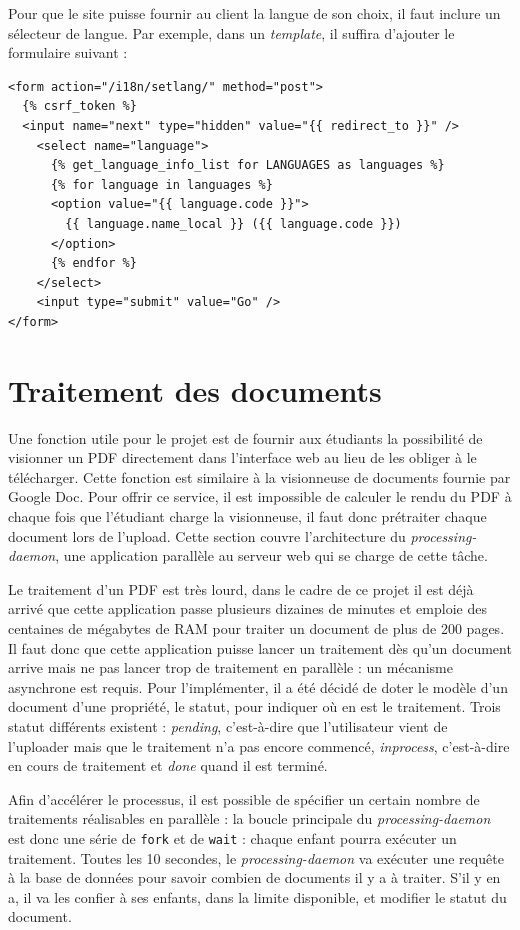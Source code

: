 \documentclass[a4paper,12pt]{article}
\begin{document}
Pour que le site puisse fournir au client la langue de son choix, il faut inclure
un sélecteur de langue. Par exemple, dans un \textit{template}, il suffira d'ajouter
le formulaire suivant : 

\begin{verbatim}
<form action="/i18n/setlang/" method="post">
  {% csrf_token %}
  <input name="next" type="hidden" value="{{ redirect_to }}" />
    <select name="language">
      {% get_language_info_list for LANGUAGES as languages %}
      {% for language in languages %}
      <option value="{{ language.code }}">
        {{ language.name_local }} ({{ language.code }})
      </option>
      {% endfor %}
    </select>
    <input type="submit" value="Go" />
</form>
\end{verbatim}


\section{Traitement des documents}

Une fonction utile pour le projet est de fournir aux étudiants la possibilité
de visionner un PDF directement dans l'interface web au lieu de les obliger
à le télécharger. Cette fonction est similaire à la visionneuse de documents fournie
par Google Doc. Pour offrir ce service, il est impossible de calculer le rendu du PDF
à chaque fois que l'étudiant charge la visionneuse, il faut donc prétraiter chaque
document lors de l'upload. Cette section couvre l'architecture du \textit{processing-daemon},
une application parallèle au serveur web qui se charge de cette tâche.

Le traitement d'un PDF est très lourd, dans le cadre de ce projet il est déjà
arrivé que cette application passe plusieurs dizaines de minutes et emploie des centaines
de mégabytes de RAM pour traiter un document de plus de 200 pages. Il faut
donc que cette application puisse lancer un traitement dès qu'un document arrive
mais ne pas lancer trop de traitement en parallèle : un mécanisme asynchrone est requis.
Pour l'implémenter, il a été décidé de doter le modèle d'un document d'une propriété,
le statut, pour indiquer où en est le traitement. Trois statut différents existent :  \textit{pending}, c'est-à-dire
que l'utilisateur vient de l'uploader mais que le traitement n'a pas encore commencé,
\textit{inprocess}, c'est-à-dire en cours de traitement et \textit{done} quand il est terminé.

Afin d'accélérer le processus, il est possible de spécifier un certain
nombre de traitements réalisables en parallèle : la boucle principale du \textit{processing-daemon}
est donc une série de \texttt{fork} et de \texttt{wait} : chaque enfant pourra exécuter un traitement.
Toutes les 10 secondes, le \textit{processing-daemon} va exécuter une requête à la base
de données pour savoir combien de documents il y a à traiter. S'il y en a, il va les confier
à ses enfants, dans la limite disponible, et modifier le statut du document.
\end{document}
